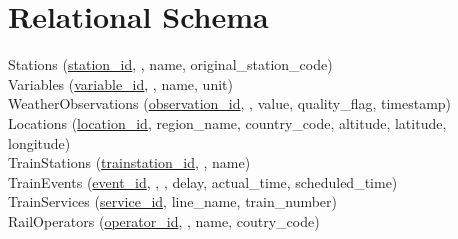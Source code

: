 \section*{Relational Schema}

Stations (\uline{station\_id}, , name, original\_station\_code) \\
Variables (\uline{variable\_id}, , name, unit) \\
WeatherObservations (\uline{observation\_id}, , value, quality\_flag, timestamp) \\
Locations (\uline{location\_id}, region\_name, country\_code, altitude, latitude, longitude) \\
TrainStations (\uline{trainstation\_id}, , name) \\
TrainEvents (\uline{event\_id}, , , delay, actual\_time, scheduled\_time) \\
TrainServices (\uline{service\_id}, line\_name, train\_number) \\
RailOperators (\uline{operator\_id}, , name, coutry\_code) \\
